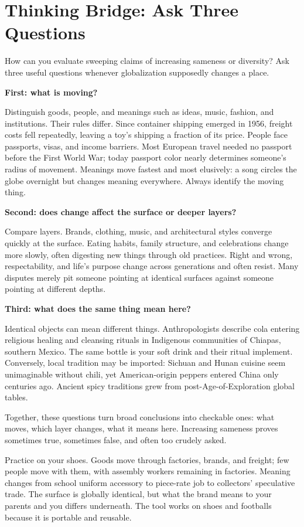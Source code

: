 \section{Thinking Bridge: Ask Three Questions}
How can you evaluate sweeping claims of increasing sameness or diversity? Ask three useful questions whenever globalization supposedly changes a place.

\textbf{First: what is moving?}

Distinguish goods, people, and meanings such as ideas, music, fashion, and institutions. Their rules differ. Since container shipping emerged in 1956, freight costs fell repeatedly, leaving a toy's shipping a fraction of its price. People face passports, visas, and income barriers. Most European travel needed no passport before the First World War; today passport color nearly determines someone's radius of movement. Meanings move fastest and most elusively: a song circles the globe overnight but changes meaning everywhere. Always identify the moving thing.

\textbf{Second: does change affect the surface or deeper layers?}

Compare layers. Brands, clothing, music, and architectural styles converge quickly at the surface. Eating habits, family structure, and celebrations change more slowly, often digesting new things through old practices. Right and wrong, respectability, and life's purpose change across generations and often resist. Many disputes merely pit someone pointing at identical surfaces against someone pointing at different depths.

\textbf{Third: what does the same thing mean here?}

Identical objects can mean different things. Anthropologists describe cola entering religious healing and cleansing rituals in Indigenous communities of Chiapas, southern Mexico. The same bottle is your soft drink and their ritual implement. Conversely, local tradition may be imported: Sichuan and Hunan cuisine seem unimaginable without chili, yet American-origin peppers entered China only centuries ago. Ancient spicy traditions grew from post-Age-of-Exploration global tables.

Together, these questions turn broad conclusions into checkable ones: what moves, which layer changes, what it means here. Increasing sameness proves sometimes true, sometimes false, and often too crudely asked.

Practice on your shoes. Goods move through factories, brands, and freight; few people move with them, with assembly workers remaining in factories. Meaning changes from school uniform accessory to piece-rate job to collectors' speculative trade. The surface is globally identical, but what the brand means to your parents and you differs underneath. The tool works on shoes and footballs because it is portable and reusable.

